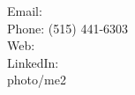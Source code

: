 \documentclass[letterpaper,11pt]{article}
\begin{document}


{
    Email:  \\
    Phone: (515) 441-6303\\
    Web:  \\ 
    LinkedIn:  \\
}
{photo/me2}
















\end{document}
